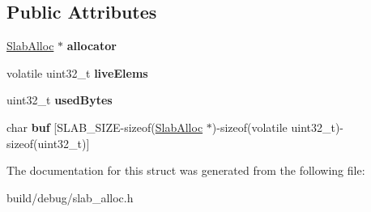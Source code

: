 \subsection*{Public Attributes}
\begin{DoxyCompactItemize}
\item 
\hypertarget{structslab_1_1Slab_abdc8068d1eacd94a27e7bb6ae0d14f99}{\hyperlink{classslab_1_1SlabAlloc}{Slab\-Alloc} $\ast$ {\bfseries allocator}}\label{structslab_1_1Slab_abdc8068d1eacd94a27e7bb6ae0d14f99}

\item 
\hypertarget{structslab_1_1Slab_ab4a4d8bb35fb3ab67034448e6d8d6fc1}{volatile uint32\-\_\-t {\bfseries live\-Elems}}\label{structslab_1_1Slab_ab4a4d8bb35fb3ab67034448e6d8d6fc1}

\item 
\hypertarget{structslab_1_1Slab_a1a789c2f9ac7d27f4e123c0bd6c20580}{uint32\-\_\-t {\bfseries used\-Bytes}}\label{structslab_1_1Slab_a1a789c2f9ac7d27f4e123c0bd6c20580}

\item 
\hypertarget{structslab_1_1Slab_aa74990c9d3aafb1cd1d5c587c14f3ef0}{char {\bfseries buf} \mbox{[}S\-L\-A\-B\-\_\-\-S\-I\-Z\-E-\/sizeof(\hyperlink{classslab_1_1SlabAlloc}{Slab\-Alloc} $\ast$)-\/sizeof(volatile uint32\-\_\-t)-\/sizeof(uint32\-\_\-t)\mbox{]}}\label{structslab_1_1Slab_aa74990c9d3aafb1cd1d5c587c14f3ef0}

\end{DoxyCompactItemize}


The documentation for this struct was generated from the following file\-:\begin{DoxyCompactItemize}
\item 
build/debug/slab\-\_\-alloc.\-h\end{DoxyCompactItemize}
